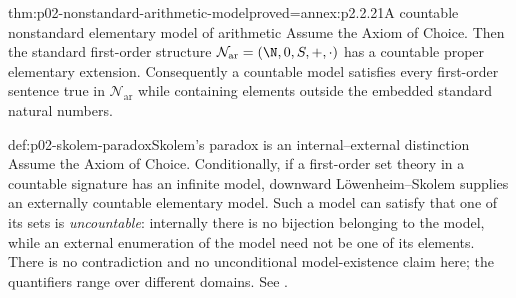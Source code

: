 \begin{hbcorollary}{thm:p02-nonstandard-arithmetic-model}{proved=annex:p2.2.21}{A countable nonstandard elementary model of arithmetic}
Assume the Axiom of Choice.  Then the standard first-order structure
\(\mathcal N_{\mathrm{ar}}=(\N,0,S,+,\cdot)\) has a countable proper
elementary extension.  Consequently a countable model satisfies every
first-order sentence true in \(\mathcal N_{\mathrm{ar}}\) while containing
elements outside the embedded standard natural numbers.
\end{hbcorollary}

\begin{hbwarning}{def:p02-skolem-paradox}{Skolem's paradox is an internal--external distinction}
Assume the Axiom of Choice.  Conditionally, if a first-order set theory in a
countable signature has an infinite model, downward L\"owenheim--Skolem
supplies an externally countable elementary model.  Such a model can satisfy
that one of its sets is
\emph{uncountable}: internally there is no bijection belonging to the model,
while an external enumeration of the model need not be one of its elements.
There is no contradiction and no unconditional model-existence claim here;
the quantifiers range over different domains.  See \cite{Skolem1934,Hodges1993}.
\end{hbwarning}
